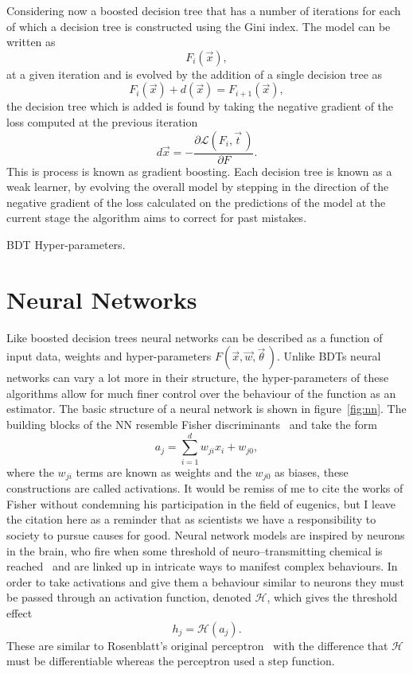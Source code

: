 Considering now a boosted decision tree that has a number of iterations for each
of which a decision tree is constructed using the Gini index. The model can be
written as
\begin{equation}
  F_i(\vec{x}),
\end{equation}
at a given iteration and is evolved by the addition of a single decision tree as
\begin{equation}
  F_i({\vec{x}}) + d(\vec{x}) = F_{i+1}(\vec{x}),
\end{equation}
the decision tree which is added is found by taking the negative gradient of the
loss computed at the previous iteration
\begin{equation}
  d{\vec{x}} = - \frac{\partial \mathcal{L}(F_i, \vec{t} \,)}{\partial F}.
\end{equation}
This is process is known as gradient boosting. Each decision tree is known as a
weak learner, by evolving the overall model by stepping in the direction of the
negative gradient of the loss calculated on the predictions of the model at the
current stage the algorithm aims to correct for past mistakes.

BDT Hyper-parameters.

\section{Neural Networks}%

\label{sec:neural-networks}

Like boosted decision trees neural networks can be described as a function of
input data, weights and hyper-parameters $F(\vec{x}, \vec{w}, \vec{\theta} \,)$.
Unlike BDTs neural networks can vary a lot more in their structure, the
hyper-parameters of these algorithms allow for much finer control over the
behaviour of the function as an estimator. The basic structure of a neural
network is shown in figure~\ref{fig:nn}.  The building blocks of the NN resemble
Fisher discriminants~\cite{Fisher} and take the form
\begin{equation}
a_j = \sum_{i=1}^{d} w_{ji}x_{i} + w_{j0},
\label{eq:fisher}
\end{equation}
where the $w_{ji}$ terms are known as weights and the $w_{j0}$ as biases, these
constructions are called activations. It would be remiss of me to cite the works
of Fisher without condemning his participation in the field of eugenics, but I
leave the citation here as a reminder that as scientists we have a
responsibility to society to pursue causes for good. Neural network models are
inspired by neurons in the brain, who fire when some threshold of
neuro--transmitting chemical is reached~\cite{biology} and are linked up in
intricate ways to manifest complex behaviours. In order to take activations and
give them a behaviour similar to neurons they must be passed through an
activation function, denoted $\mathcal{H}$, which gives the threshold effect
\begin{equation}
h_j = \mathcal{H}(a_j).
\label{eq:hiddenunit}
\end{equation}
These are similar to Rosenblatt's original perceptron~\cite{Rosenblatt} with the
difference that $\mathcal{H}$ must be differentiable whereas the perceptron used
a step function.

